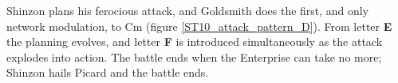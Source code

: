 Shinzon plans his ferocious attack, and Goldsmith does the first, and only network modulation, to Cm (figure \ref{ST10_attack_pattern_D}). From letter \textbf{E} the planning evolves, and letter \textbf{F} is introduced simultaneously as the attack explodes into action. The battle ends when the Enterprise can take no more; Shinzon hails Picard and the battle ends. 
\clearpage
 

